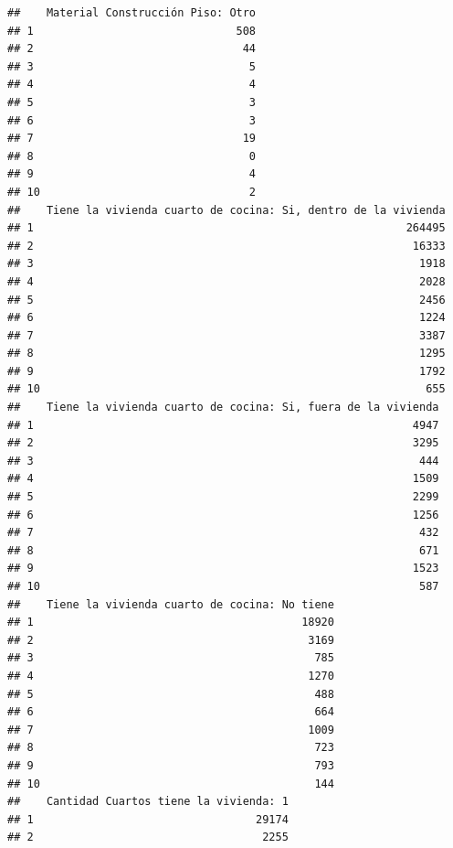 \documentclass[11pt,]{article}
\begin{document}
\begin{verbatim}
##    Material Construcción Piso: Otro
## 1                               508
## 2                                44
## 3                                 5
## 4                                 4
## 5                                 3
## 6                                 3
## 7                                19
## 8                                 0
## 9                                 4
## 10                                2
##    Tiene la vivienda cuarto de cocina: Si, dentro de la vivienda
## 1                                                         264495
## 2                                                          16333
## 3                                                           1918
## 4                                                           2028
## 5                                                           2456
## 6                                                           1224
## 7                                                           3387
## 8                                                           1295
## 9                                                           1792
## 10                                                           655
##    Tiene la vivienda cuarto de cocina: Si, fuera de la vivienda
## 1                                                          4947
## 2                                                          3295
## 3                                                           444
## 4                                                          1509
## 5                                                          2299
## 6                                                          1256
## 7                                                           432
## 8                                                           671
## 9                                                          1523
## 10                                                          587
##    Tiene la vivienda cuarto de cocina: No tiene
## 1                                         18920
## 2                                          3169
## 3                                           785
## 4                                          1270
## 5                                           488
## 6                                           664
## 7                                          1009
## 8                                           723
## 9                                           793
## 10                                          144
##    Cantidad Cuartos tiene la vivienda: 1
## 1                                  29174
## 2                                   2255

\end{verbatim}
\end{document}
